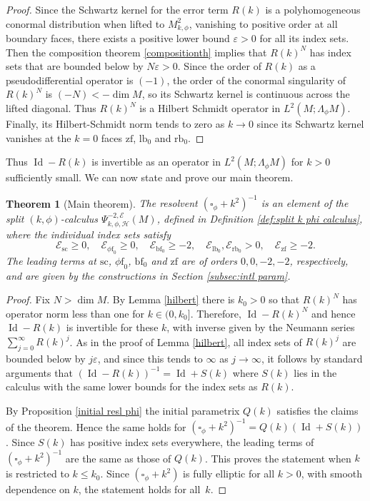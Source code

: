 \documentclass[JEP,XML,SOM,Unicode,NoFloatCountersInSection,published]{cedram}
\theoremstyle{plain}
\newtheorem{Th}{Theorem}[section]
\theoremstyle{definition}
\newcommand\calE{{\mathcal E}}
\newcommand{\calH}{{\mathscr{H}}}
\newcommand{\phif}{{\phi\mathrm{f}}}
\newcommand{\lf}{{\mathrm{lb}}}
\newcommand{\rf}{{\mathrm{rb}}}
\newcommand{\bbf}{{\mathrm{bf}}}
\newcommand{\bbfz}{{\bbf_0}}
\newcommand{\ssc}{{\mathrm{sc}}}
\newcommand{\zf}{{\mathrm{zf}}}
\DeclareMathOperator{\Id}{Id}
\let\eps\varepsilon
\begin{document}
\begin{proof}
Since the Schwartz kernel for the error term $R(k)$ is a polyhomogeneous
conormal distribution when lifted to $M^2_{k,\phi}$, vanishing to positive order at all boundary faces,
there exists a positive lower bound $\varepsilon > 0$ for all its index sets.
Then the composition theorem \ref{compositionth} implies that $R(k)^N$ has index sets that are bounded below by
$N\varepsilon>0$. Since the order of $R(k)$ as a pseudodifferential operator is $(-1)$, the order of the conormal singularity of $R(k)^N$ is $(-N)<-\dim M$, so its Schwartz kernel is continuous across the lifted diagonal.
Thus $R(k)^N$ is a Hilbert Schmidt operator in $L^2(M;\Lambda_\phi M)$.
Finally, its Hilbert-Schmidt norm tends to zero as $k\to0$ since its Schwartz kernel vanishes at the $k=0$ faces $\zf$, $\lf_0$ and $\rf_0$.
\end{proof}

Thus $\Id - R(k)$ is invertible as an operator in $L^2(M;\Lambda_\phi M)$ for $k>0$ sufficiently small.
We can now state and prove our main theorem.

\begin{Th}[Main theorem] \label{thm:main thm detail}
The resolvent $(\square_{\phi} + k^{2})^{-1}$ is an element of the split $(k,\phi)$-calculus
$\Psi_{k, \phi,\calH}^{-2,\calE}(M)$, defined in Definition \ref{def:split k phi calculus}, where the individual index sets satisfy\vspace*{-3pt}
\begin{equation}\label{lower-bounds-index-sets}
\mathcal{E}_{\ssc} \geq 0,\quad
\mathcal{E}_{\phif_0} \geq 0, \quad
\mathcal{E}_{\bbf_0} \geq -2, \quad \mathcal{E}_{\lf_0}, \mathcal{E}_{\rf_0} >0,
\quad \mathcal{E}_{\zf} \geq -2.
\end{equation}
The leading terms at $\ssc$, $\phif_0$, $\bbfz$ and $\zf$ are of orders $0,0,-2,-2$, respectively, and are given by the constructions in Section \ref{subsec:intl param}.
\end{Th}

\begin{proof}
Fix $N>\dim M$.
By Lemma \ref{hilbert} there is $k_0>0$ so that $R(k)^N$ has operator norm less than one for $k\in(0,k_0]$.
Therefore, $\Id - R(k)^N$ and hence
$\Id - R(k)$ is invertible for these $k$, with inverse given by the Neumann series $\sum_{j=0}^\infty R(k)^j$.
As in the proof of Lemma \ref{hilbert}, all index sets of $R(k)^{j}$ are bounded below by $j\eps$, and since this tends to $\infty$ as $j\to\infty$, it follows by standard arguments that $(\Id - R(k))^{-1}=\Id+S(k)$ where $S(k)$ lies in the calculus with the same lower bounds for the index sets as $R(k)$.

By Proposition \ref{initial resl phi} the initial parametrix $Q(k)$ satisfies the claims of the theorem. Hence the same holds for $(\square_\phi+k^2)^{-1} = Q(k)(\Id+S(k))$.
Since $S(k)$ has positive index sets everywhere, the leading terms of $(\square_\phi+k^2)^{-1}$ are the same as those of $Q(k)$.
This proves the statement when $k$ is restricted to $k\leq k_0$. Since
$(\square_{\phi} + k^{2})$ is fully elliptic for all $k>0$, with smooth dependence on $k$, the statement holds for all~$k$.
\end{proof}
\end{document}
